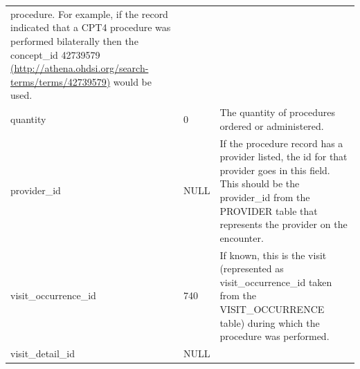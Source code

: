 \documentclass[]{book}
\begin{document}
\begin{longtable}[]{@{}lll@{}}
\begin{minipage}[t]{0.47\columnwidth}
procedure. For example, if the record indicated that a CPT4 procedure
was performed bilaterally then the concept\_id 42739579
\href{http://athena.ohdsi.org/search-terms/terms/42739579}{(http://athena.ohdsi.org/search-terms/terms/42739579)}
would be used.\strut
\end{minipage}\tabularnewline
\begin{minipage}[t]{0.30\columnwidth}\raggedright\strut
quantity\strut
\end{minipage} & \begin{minipage}[t]{0.14\columnwidth}\raggedright\strut
0\strut
\end{minipage} & \begin{minipage}[t]{0.47\columnwidth}\raggedright\strut
The quantity of procedures ordered or administered.\strut
\end{minipage}\tabularnewline
\begin{minipage}[t]{0.30\columnwidth}\raggedright\strut
provider\_id\strut
\end{minipage} & \begin{minipage}[t]{0.14\columnwidth}\raggedright\strut
NULL\strut
\end{minipage} & \begin{minipage}[t]{0.47\columnwidth}\raggedright\strut
If the procedure record has a provider listed, the id for that provider
goes in this field. This should be the provider\_id from the PROVIDER
table that represents the provider on the encounter.\strut
\end{minipage}\tabularnewline
\begin{minipage}[t]{0.30\columnwidth}\raggedright\strut
visit\_occurrence\_id\strut
\end{minipage} & \begin{minipage}[t]{0.14\columnwidth}\raggedright\strut
740\strut
\end{minipage} & \begin{minipage}[t]{0.47\columnwidth}\raggedright\strut
If known, this is the visit (represented as visit\_occurrence\_id taken
from the VISIT\_OCCURRENCE table) during which the procedure was
performed.\strut
\end{minipage}\tabularnewline
\begin{minipage}[t]{0.30\columnwidth}\raggedright\strut
visit\_detail\_id\strut
\end{minipage} & \begin{minipage}[t]{0.14\columnwidth}\raggedright\strut
NULL\strut
\end{minipage} & \begin{minipage}[t]{0.47\columnwidth}\raggedright\strut

\end{minipage}
\end{longtable}
\end{document}
